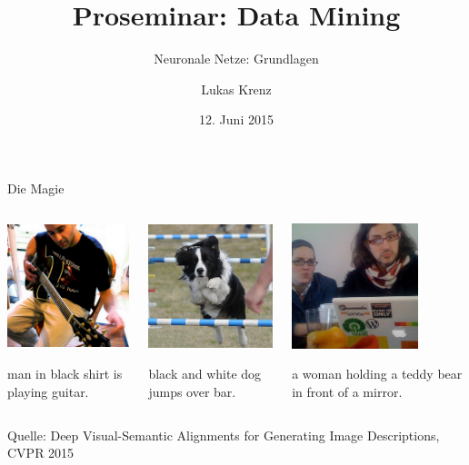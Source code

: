 \documentclass[10pt, compress, xetex]{beamer}
\title{Proseminar: Data Mining}
\subtitle{Neuronale Netze: Grundlagen}
\author{Lukas Krenz}
\date{12. Juni 2015}
\institute{Technische Universität München}
\begin{document}
\begin{frame}
\titlepage
\end{frame}
 \begin{frame}{Die Magie}
      
  \begin{columns}[c]
    \begin{column}[c]{.33\textwidth}
    \includegraphics[height=3.66cm]{figures/guitar.png}

    man in black shirt is playing guitar.
    \end{column}
    \begin{column}[c]{.33\textwidth}
    \includegraphics[height=3.66cm]{figures/dogbar.png}

    black and white dog jumps over bar.
    \end{column}
    \begin{column}[c]{.33\textwidth}

    \includegraphics[height=3.66cm]{figures/teddy.jpeg}

    a woman holding a teddy bear in front of a mirror.
    \end{column}  
  \end{columns}

  Quelle: Deep Visual-Semantic Alignments for Generating Image Descriptions, CVPR 2015
 \end{frame}
\end{document}
